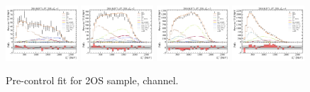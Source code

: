 \begin{figure}[htb]
    \includegraphics[width=0.24\textwidth]{./figs-supplemental-plots/pre-ctrl-fit/lines_q2_slices/fit_result-lines_q2_idx1-D0-2os-el.pdf}
    \includegraphics[width=0.24\textwidth]{./figs-supplemental-plots/pre-ctrl-fit/lines_q2_slices/fit_result-lines_q2_idx2-D0-2os-el.pdf}
    \includegraphics[width=0.24\textwidth]{./figs-supplemental-plots/pre-ctrl-fit/lines_q2_slices/fit_result-lines_q2_idx3-D0-2os-el.pdf}
    \includegraphics[width=0.24\textwidth]{./figs-supplemental-plots/pre-ctrl-fit/lines_q2_slices/fit_result-lines_q2_idx4-D0-2os-el.pdf}

    \caption{Pre-control fit for 2OS sample, \Dz channel.}
    \label{fig:pre-ctrl-2os-d0}
\end{figure}

